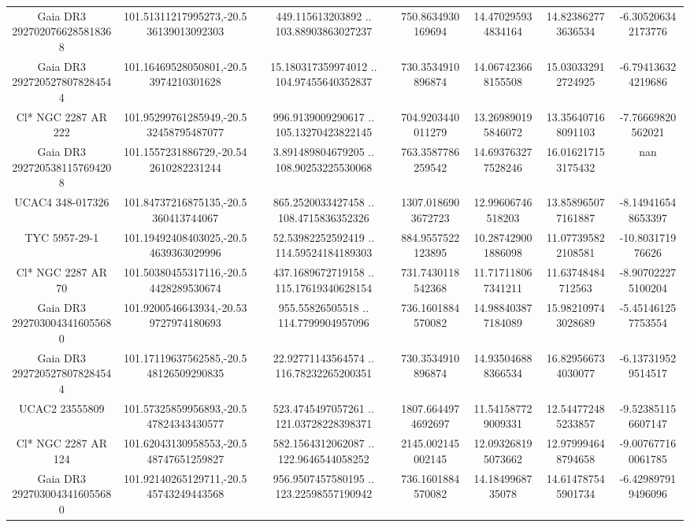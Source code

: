 \begin{table}
\begin{tabular}{ccccccc}
Gaia DR3 2927020766285818368 & 101.51311217995273,-20.536139013092303 & 449.115613203892 .. 103.88903863027237 & 750.8634930169694 & 14.470295934834164 & 14.823862773636534 & -6.305206342173776 \\
Gaia DR3 2927205278078284544 & 101.16469528050801,-20.53974210301628 & 15.180317359974012 .. 104.97455640352837 & 730.3534910896874 & 14.067423668155508 & 15.030332912724925 & -6.794136324219686 \\
Cl* NGC 2287     AR     222 & 101.95299761285949,-20.532458795487077 & 996.9139009290617 .. 105.13270423822145 & 704.9203440011279 & 13.269890195846072 & 13.356407168091103 & -7.76669820562021 \\
Gaia DR3 2927205381157694208 & 101.1557231886729,-20.542610282231244 & 3.891489804679205 .. 108.90253225530068 & 763.3587786259542 & 14.693763277528246 & 16.016217153175432 & nan \\
UCAC4 348-017326 & 101.84737216875135,-20.5360413744067 & 865.2520033427458 .. 108.4715836352326 & 1307.0186903672723 & 12.99606746518203 & 13.858965077161887 & -8.149416548653397 \\
TYC 5957-29-1 & 101.19492408403025,-20.54639363029996 & 52.53982252592419 .. 114.59524184189303 & 884.9557522123895 & 10.287429001886098 & 11.077395822108581 & -10.803171976626 \\
Cl* NGC 2287     AR      70 & 101.50380455317116,-20.54428289530674 & 437.1689672719158 .. 115.17619340628154 & 731.7430118542368 & 11.717118067341211 & 11.63748484712563 & -8.907022275100204 \\
Gaia DR3 2927030043416055680 & 101.9200546643934,-20.539727974180693 & 955.55826505518 .. 114.7799904957096 & 736.1601884570082 & 14.988403877184089 & 15.982109743028689 & -5.451461257753554 \\
Gaia DR3 2927205278078284544 & 101.17119637562585,-20.548126509290835 & 22.92771143564574 .. 116.78232265200351 & 730.3534910896874 & 14.935046888366534 & 16.829566734030077 & -6.137319529514517 \\
UCAC2  23555809 & 101.57325859956893,-20.547824343430577 & 523.4745497057261 .. 121.03728228398371 & 1807.6644974692697 & 11.541587729009331 & 12.544772485233857 & -9.523851156607147 \\
Cl* NGC 2287     AR     124 & 101.62043130958553,-20.548747651259827 & 582.1564312062087 .. 122.9646544058252 & 2145.002145002145 & 12.093268195073662 & 12.979994648794658 & -9.007677160061785 \\
Gaia DR3 2927030043416055680 & 101.92140265129711,-20.545743249443568 & 956.9507457580195 .. 123.22598557190942 & 736.1601884570082 & 14.1849968735078 & 14.614787545901734 & -6.429897919496096 \\

\end{tabular}
\end{table}
